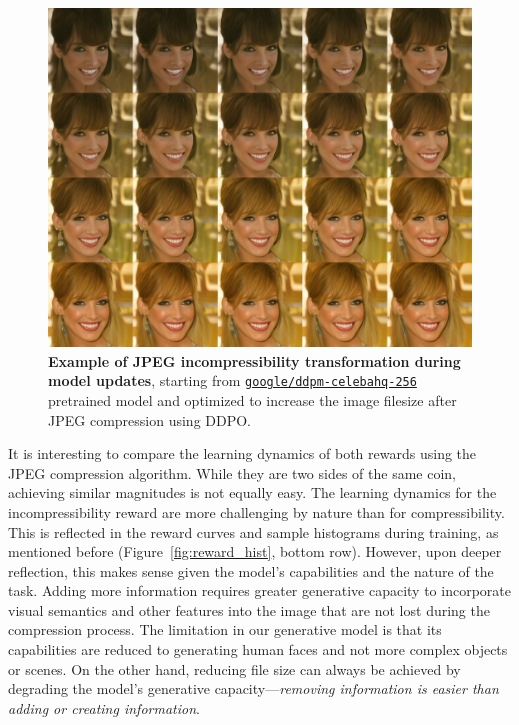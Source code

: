 \begin{figure}[ht]
  \centering
  \includegraphics[scale=1.40]{img/results/incompressibility_26.png}
  \vspace{-0pt}  %
    \captionsetup{width=\textwidth} %
    \caption{\textbf{Example of JPEG incompressibility transformation during model updates}, starting from \href{https://huggingface.co/google/ddpm-celebahq-256}{\texttt{\texttt{google/ddpm-celebahq-256}}}
    pretrained model and optimized to increase the image filesize after JPEG compression using DDPO.}
    \label{fig:ddpm-to-ddpo-incompressibility}
\end{figure}

\noindent It is interesting to compare the learning dynamics of both rewards using the JPEG compression algorithm. While they are two sides of the same coin, achieving similar magnitudes is not equally easy. The learning dynamics for the incompressibility reward are more challenging by nature than for compressibility. This is reflected in the reward curves and sample histograms during training, as mentioned before (Figure~\ref{fig:reward_hist}, bottom row). However, upon deeper reflection, this makes sense given the model's capabilities and the nature of the task. Adding more information requires greater generative capacity to incorporate visual semantics and other features into the image that are not lost during the compression process. The limitation in our generative model is that its capabilities are reduced to generating human faces and not more complex objects or scenes. On the other hand, reducing file size can always be achieved by degrading the model's generative capacity---\textit{removing information is easier than adding or creating information}. \\

